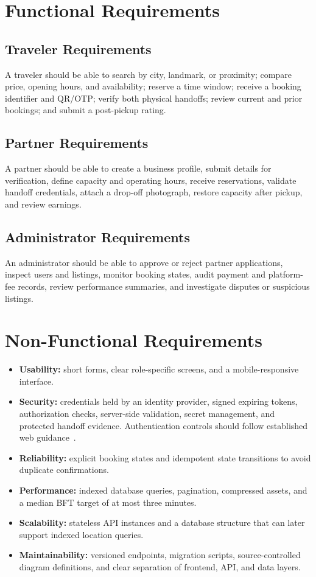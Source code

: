 \documentclass{tietreport}
\begin{document}
\section{Functional Requirements}
\subsection{Traveler Requirements}
A traveler should be able to search by city, landmark, or proximity; compare price, opening hours, and availability; reserve a time window; receive a booking identifier and QR/OTP; verify both physical handoffs; review current and prior bookings; and submit a post-pickup rating.

\subsection{Partner Requirements}
A partner should be able to create a business profile, submit details for verification, define capacity and operating hours, receive reservations, validate handoff credentials, attach a drop-off photograph, restore capacity after pickup, and review earnings.

\subsection{Administrator Requirements}
An administrator should be able to approve or reject partner applications, inspect users and listings, monitor booking states, audit payment and platform-fee records, review performance summaries, and investigate disputes or suspicious listings.

\section{Non-Functional Requirements}
\begin{itemize}[leftmargin=*]
  \item \textbf{Usability:} short forms, clear role-specific screens, and a mobile-responsive interface.
  \item \textbf{Security:} credentials held by an identity provider, signed expiring tokens, authorization checks, server-side validation, secret management, and protected handoff evidence. Authentication controls should follow established web guidance~\cite{owasp-auth}.
  \item \textbf{Reliability:} explicit booking states and idempotent state transitions to avoid duplicate confirmations.
  \item \textbf{Performance:} indexed database queries, pagination, compressed assets, and a median BFT target of at most three minutes.
  \item \textbf{Scalability:} stateless API instances and a database structure that can later support indexed location queries.
  \item \textbf{Maintainability:} versioned endpoints, migration scripts, source-controlled diagram definitions, and clear separation of frontend, API, and data layers.
\end{itemize}
\end{document}
